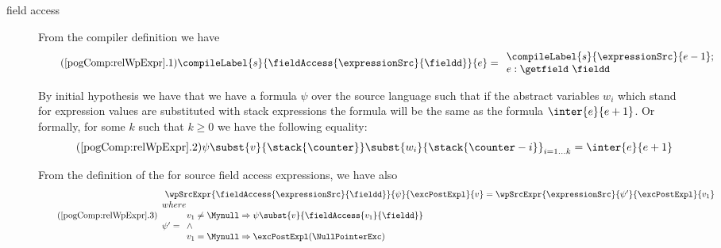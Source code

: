 \begin{description}
       \item[field access]
            
	            From the compiler definition we have
                     \begin{equation*}\label{pog1} \tag{\ref{pogComp:relWpExpr}.1}
		       \compileLabel{s}{\fieldAccess{\expressionSrc}{\fieldd}}{e} = \\
		     \begin{array}{l}
			   \compileLabel{s}{\expressionSrc}{e - 1}; \\ 
			    e  : \getfield  \ \fieldd
			    \end{array}
		     \end{equation*}
		 	
	       By initial hypothesis we have that we have a formula $\psi$ over the source language such that if the abstract variables $w_i$ 
	       which stand for expression values are substituted with stack expressions the formula will be the same as the formula
	      $\inter{e}{e+1} $. Or formally,  for some $k$ such that $k \ge 0$ we have the following equality:      \\
	      \begin{equation*}\label{pog2} \tag{\ref{pogComp:relWpExpr}.2}  
	            \psi \subst{v}{\stack{\counter}}\subst{w_i}{\stack{\counter - i}}_{i = 1 \ldots k}  = \inter{e}{e+1} 
	      \end{equation*}	    

		  From the definition of the \wpName{} for source field access expressions, we have also   
		   \begin{equation*}\label{pog3} \tag{\ref{pogComp:relWpExpr}.3}  
		   \begin{array}{l} \ \wpSrcExpr{\fieldAccess{\expressionSrc}{\fieldd} }{\psi}{\excPostExpl}{v} = 
		  \wpSrcExpr{\expressionSrc}{\psi'}{\excPostExpl }{v_1}  \\
		  where \\ 
		   \psi'  =                   \begin{array}{l} 
		                                 v_1 \neq \Mynull \Rightarrow \psi \subst{v}{\fieldAccess{v_1}{\fieldd}} \\
						 \wedge \\
						 v_1 = \Mynull \Rightarrow  \excPostExpl(\NullPointerExc)
					       \end{array}
				\end{array}  \\
		  \end{equation*}
		 

\end{description}

